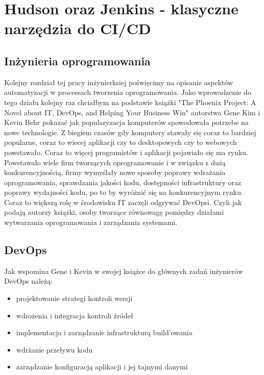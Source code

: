 \section{Hudson oraz Jenkins - klasyczne narzędzia do CI/CD}

\subsection{Inżynieria oprogramowania}
Kolejny rozdział tej pracy inżynierksiej poświęcimy na opisanie aspektów automatyzacji w processach tworzenia oprogramowania. 
Jako wprowadzenie do tego działu kolejny raz chciałbym na podstawie książki "The Phoenix Project: A Novel about IT, DevOps, and Helping Your Business Win" autorstwa Gene Kim i Kevin Behr pokazać jak popularyzacja komputerów spowodowała potrzebe na nowe technologie. 
Z biegiem czasów gdy komputery stawały się coraz to bardziej popularne, coraz to wiecej aplikacji czy to desktopowych czy to webowych powstawało. Coraz to więcej programistów i aplikacji pojawiało się ma rynku. Powstawało wiele firm tworzących oprogramowanie i w związku z dużą konkurencyjnością, firmy wymyślały nowe sposoby poprawy wdrażania oprogramowania, sprawdzania jakości kodu, dostępności infrastruktury oraz poprawy wydajności kodu, po to by wyróżnić się na konkurencyjnym rynku. Coraz to większą rolę w środowisku IT zaczęli odgrywać  DevOpsi. Czyli jak podają autorzy książki, osoby tworzące równowagę pomiędzy działami wytwarzania oprogramowania i zarządzania systemami.  


\subsection{DevOps} 
Jak wspomina Gene i Kevin w swojej książce do głównych zadań inżynierów DevOps należą:
\begin{itemize}
    \item projektowanie strategi kontroli wersji
    \item wdrożenia i integracja kontroli źródeł
    \item implementacja i zarządzanie infrastrukturą build'owania
    \item wdrżanie przeływu kodu
    \item zarządzanie konfiguracją aplikacji i jej tajnymi danymi
\end{itemize}

